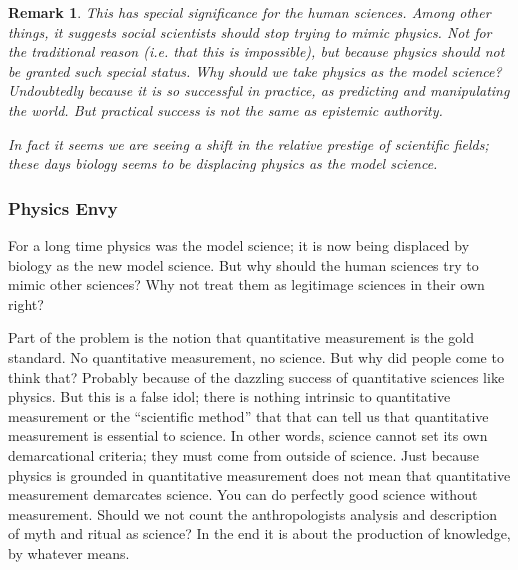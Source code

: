 \documentclass[11pt,twoside]{article}
\newtheorem{remark}{Remark}
\begin{document}
\begin{remark}
  This has special significance for the human sciences.  Among other
  things, it suggests social scientists should stop trying to mimic
  physics.  Not for the traditional reason (i.e. that this is
  impossible), but because physics should not be granted such special
  status.  Why should we take physics as the model science?
  Undoubtedly because it is so successful in practice, as predicting
  and manipulating the world.  But practical success is not the same
  as epistemic authority.

  In fact it seems we are seeing a shift in the relative prestige of
  scientific fields; these days biology seems to be displacing physics
  as the model science.
\end{remark}

\cite{pinker_science_2013}

\cite{wieseltier_crimes_2013}

\cite{pinker_why_2004}

\cite{rorty_philosophy-envy_2004}

\subsubsection{Physics Envy}

  For a long time physics was the model science; it is now being
  displaced by biology as the new model science.  But why should the
  human sciences try to mimic other sciences?  Why not treat them as
  legitimage sciences in their own right?

  Part of the problem is the notion that quantitative measurement is
  the gold standard.  No quantitative measurement, no science.  But
  why did people come to think that?  Probably because of the dazzling
  success of quantitative sciences like physics.  But this is a false
  idol; there is nothing intrinsic to quantitative measurement or the
  ``scientific method'' that that can tell us that quantitative
  measurement is essential to science.  In other words, science cannot
  set its own demarcational criteria; they must come from outside of
  science.  Just because physics is grounded in quantitative
  measurement does not mean that quantitative measurement demarcates
  science.  You can do perfectly good science without measurement.
  Should we not count the anthropologists analysis and description of
  myth and ritual as science?  In the end it is about the production
  of knowledge, by whatever means.
\end{document}
